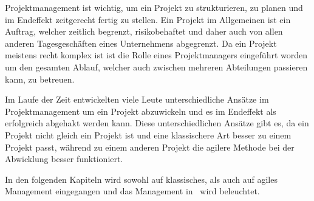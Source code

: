 
Projektmanagement ist wichtig, um ein Projekt zu strukturieren, zu planen und im Endeffekt zeitgerecht fertig zu stellen. Ein Projekt im Allgemeinen ist ein Auftrag, welcher zeitlich begrenzt, risikobehaftet und daher auch von allen anderen Tagesgeschäften eines Unternehmens abgegrenzt. Da ein Projekt meistens recht komplex ist ist die Rolle eines Projektmanagers eingeführt worden um den gesamten Ablauf, welcher auch zwischen mehreren Abteilungen passieren kann, zu betreuen. 

Im Laufe der Zeit entwickelten viele Leute unterschiedliche Ansätze im Projektmanagement um ein Projekt abzuwickeln und es im Endeffekt als erfolgreich abgehakt werden kann. Diese unterschiedlichen Ansätze gibt es, da ein Projekt nicht gleich ein Projekt ist und eine klassischere Art besser zu einem Projekt passt, während zu einem anderen Projekt die agilere Methode bei der Abwicklung besser funktioniert. 

In den folgenden Kapiteln wird sowohl auf klassisches, als auch auf agiles Management eingegangen und das Management in \ZELIA\ wird beleuchtet. \cite{Projectman.}


